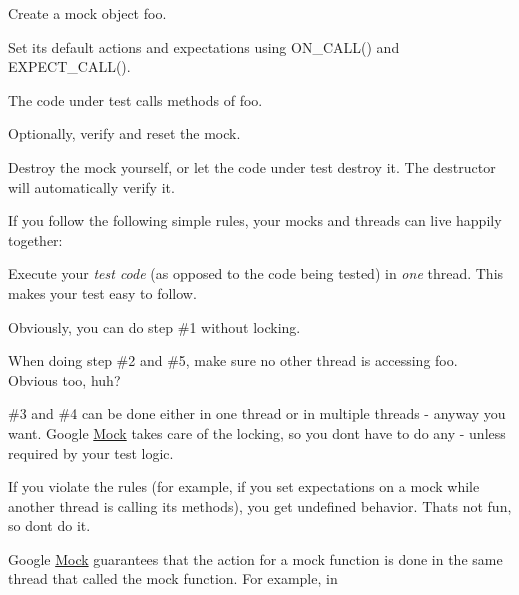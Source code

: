 \begin{DoxyEnumerate}
\item Create a mock object {\ttfamily foo}.
\end{DoxyEnumerate}
\begin{DoxyEnumerate}
\item Set its default actions and expectations using {\ttfamily O\+N\+\_\+\+C\+A\+L\+L()} and {\ttfamily E\+X\+P\+E\+C\+T\+\_\+\+C\+A\+L\+L()}.
\end{DoxyEnumerate}
\begin{DoxyEnumerate}
\item The code under test calls methods of {\ttfamily foo}.
\end{DoxyEnumerate}
\begin{DoxyEnumerate}
\item Optionally, verify and reset the mock.
\end{DoxyEnumerate}
\begin{DoxyEnumerate}
\item Destroy the mock yourself, or let the code under test destroy it. The destructor will automatically verify it.
\end{DoxyEnumerate}

If you follow the following simple rules, your mocks and threads can live happily together\+:


\begin{DoxyItemize}
\item Execute your {\itshape test code} (as opposed to the code being tested) in {\itshape one} thread. This makes your test easy to follow.
\item Obviously, you can do step \#1 without locking.
\item When doing step \#2 and \#5, make sure no other thread is accessing {\ttfamily foo}. Obvious too, huh?
\item \#3 and \#4 can be done either in one thread or in multiple threads -\/ anyway you want. Google \hyperlink{classMock}{Mock} takes care of the locking, so you don\textquotesingle{}t have to do any -\/ unless required by your test logic.
\end{DoxyItemize}

If you violate the rules (for example, if you set expectations on a mock while another thread is calling its methods), you get undefined behavior. That\textquotesingle{}s not fun, so don\textquotesingle{}t do it.

Google \hyperlink{classMock}{Mock} guarantees that the action for a mock function is done in the same thread that called the mock function. For example, in


